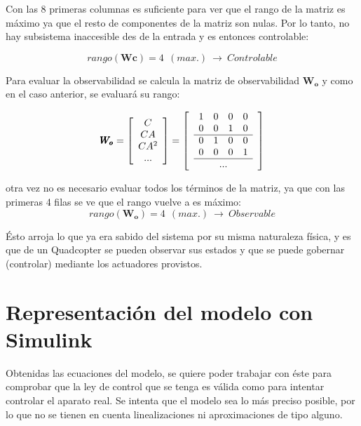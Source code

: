 \documentclass[twoside,11pt]{report}
\begin{document}
Con las 8 primeras columnas es suficiente para ver que el rango de la matriz es máximo ya que el resto de componentes de la matriz son nulas. Por lo tanto, no hay subsistema inaccesible des de la entrada y es entonces controlable:

\begin{equation}
rango(\pmb{Wc})=4\>\>(max.)\> \rightarrow \>Controlable
\end{equation}

Para evaluar la observabilidad se calcula la matriz de observabilidad $\pmb{W_o}$ y como en el caso anterior, se evaluará su rango:

\begin{equation}
\pmb{W_o}=\left[ \begin{array}{c}
C \\
CA \\
CA^2 \\
...
\end{array}\right] =\left[\begin{array}{c}

\begin{array}{cccc}
1 & 0 & 0 & 0 \\
0 & 0 & 1 & 0 \\
\hline 
0 & 1 & 0 & 0 \\
0 & 0 & 0 & 1 \\
\hline
\end{array}\\
...\\ \end{array} \right]
\end{equation}

otra vez no es necesario evaluar todos los términos de la matriz, ya que con las primeras 4 filas se ve que el rango vuelve a es máximo:
\begin{equation}
rango(\pmb{W_o})=4\>\>(max.) \> \rightarrow \> Observable
\end{equation}

Ésto arroja lo que ya era sabido del sistema por su misma naturaleza física, y es que de un Quadcopter se pueden observar sus estados y que se puede gobernar (controlar) mediante los actuadores provistos. 

\newpage
\section{Representación del modelo con Simulink}

Obtenidas las ecuaciones del modelo, se quiere poder trabajar con éste para comprobar que la ley de control que se tenga es válida como para intentar controlar el aparato real. Se intenta que el modelo sea lo más preciso posible, por lo que no se tienen en cuenta linealizaciones ni aproximaciones de tipo alguno. 
\end{document}
